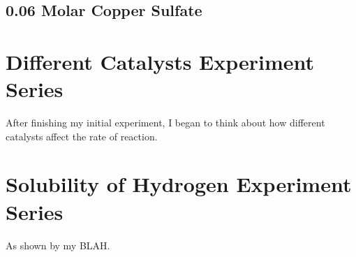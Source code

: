 	\subsection{0.06 Molar Copper Sulfate}



\section{Different Catalysts Experiment Series}

After finishing my initial experiment, I began to think about how different catalysts affect the rate of reaction. 


\section{Solubility of Hydrogen Experiment Series}

As shown by my BLAH. 